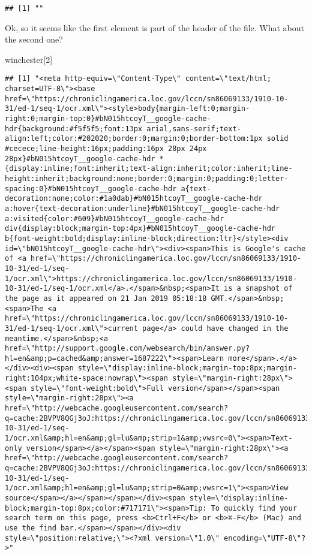 \documentclass[
]{article}
\newenvironment{Shaded}{\begin{snugshade}}{\end{snugshade}}
\newcommand{\DecValTok}[1]{\textcolor[rgb]{0.00,0.00,0.81}{#1}}
\newcommand{\NormalTok}[1]{#1}
\begin{document}
\begin{verbatim}
## [1] ""
\end{verbatim}

Ok, so it seems like the first element is part of the header of the file. What about the second one?

\begin{Shaded}
\begin{Highlighting}[]
\NormalTok{winchester[}\DecValTok{2}\NormalTok{]}
\end{Highlighting}
\end{Shaded}

\begin{verbatim}
## [1] "<meta http-equiv=\"Content-Type\" content=\"text/html; charset=UTF-8\"><base href=\"https://chroniclingamerica.loc.gov/lccn/sn86069133/1910-10-31/ed-1/seq-1/ocr.xml\"><style>body{margin-left:0;margin-right:0;margin-top:0}#bN015htcoyT__google-cache-hdr{background:#f5f5f5;font:13px arial,sans-serif;text-align:left;color:#202020;border:0;margin:0;border-bottom:1px solid #cecece;line-height:16px;padding:16px 28px 24px 28px}#bN015htcoyT__google-cache-hdr *{display:inline;font:inherit;text-align:inherit;color:inherit;line-height:inherit;background:none;border:0;margin:0;padding:0;letter-spacing:0}#bN015htcoyT__google-cache-hdr a{text-decoration:none;color:#1a0dab}#bN015htcoyT__google-cache-hdr a:hover{text-decoration:underline}#bN015htcoyT__google-cache-hdr a:visited{color:#609}#bN015htcoyT__google-cache-hdr div{display:block;margin-top:4px}#bN015htcoyT__google-cache-hdr b{font-weight:bold;display:inline-block;direction:ltr}</style><div id=\"bN015htcoyT__google-cache-hdr\"><div><span>This is Google's cache of <a href=\"https://chroniclingamerica.loc.gov/lccn/sn86069133/1910-10-31/ed-1/seq-1/ocr.xml\">https://chroniclingamerica.loc.gov/lccn/sn86069133/1910-10-31/ed-1/seq-1/ocr.xml</a>.</span>&nbsp;<span>It is a snapshot of the page as it appeared on 21 Jan 2019 05:18:18 GMT.</span>&nbsp;<span>The <a href=\"https://chroniclingamerica.loc.gov/lccn/sn86069133/1910-10-31/ed-1/seq-1/ocr.xml\">current page</a> could have changed in the meantime.</span>&nbsp;<a href=\"http://support.google.com/websearch/bin/answer.py?hl=en&amp;p=cached&amp;answer=1687222\"><span>Learn more</span>.</a></div><div><span style=\"display:inline-block;margin-top:8px;margin-right:104px;white-space:nowrap\"><span style=\"margin-right:28px\"><span style=\"font-weight:bold\">Full version</span></span><span style=\"margin-right:28px\"><a href=\"http://webcache.googleusercontent.com/search?q=cache:2BVPV8QGj3oJ:https://chroniclingamerica.loc.gov/lccn/sn86069133/1910-10-31/ed-1/seq-1/ocr.xml&amp;hl=en&amp;gl=lu&amp;strip=1&amp;vwsrc=0\"><span>Text-only version</span></a></span><span style=\"margin-right:28px\"><a href=\"http://webcache.googleusercontent.com/search?q=cache:2BVPV8QGj3oJ:https://chroniclingamerica.loc.gov/lccn/sn86069133/1910-10-31/ed-1/seq-1/ocr.xml&amp;hl=en&amp;gl=lu&amp;strip=0&amp;vwsrc=1\"><span>View source</span></a></span></span></div><span style=\"display:inline-block;margin-top:8px;color:#717171\"><span>Tip: To quickly find your search term on this page, press <b>Ctrl+F</b> or <b>⌘-F</b> (Mac) and use the find bar.</span></span></div><div style=\"position:relative;\"><?xml version=\"1.0\" encoding=\"UTF-8\"?>"

\end{verbatim}
\end{document}
